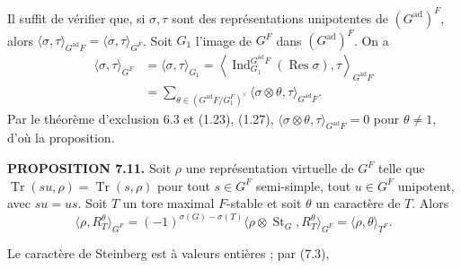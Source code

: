 \documentclass[9pt,twoside]{extarticle}
\begin{document}
{Il suffit de vérifier que, si \(\sigma,\tau\) sont des représentations unipotentes de \((G^{\mathrm{ad}})^F\), alors \(\langle\sigma,\tau\rangle_{G^{\mathrm{ad}}F}=\langle\sigma,\tau\rangle_{G^F}\). Soit \(G_1\) l'image de \(G^F\) dans \((G^{\mathrm{ad}})^F\). On a \[
\begin{aligned}
\langle\sigma,\tau\rangle_{G^F}
&=\langle\sigma,\tau\rangle_{G_1}
=\left\langle\operatorname{Ind}_{G_1}^{G^{\mathrm{ad}}F}(\operatorname{Res}\sigma),\tau\right\rangle_{G^{\mathrm{ad}}F}\\
&=\sum_{\theta\in(G^{\mathrm{ad}}F/G_1^F)^\vee}
\langle\sigma\otimes\theta,\tau\rangle_{G^{\mathrm{ad}}F}.
\end{aligned}
\] Par le théorème d'exclusion 6.3 et (1.23), (1.27), \(\langle\sigma\otimes\theta,\tau\rangle_{G^{\mathrm{ad}}F}=0\) pour \(\theta\ne1\), d'où la proposition.\par

\noindent\textbf{PROPOSITION 7.11.} Soit \(\rho\) une représentation virtuelle de \(G^F\) telle que \(\operatorname{Tr}(su,\rho)=\operatorname{Tr}(s,\rho)\) pour tout \(s\in G^F\) semi-simple, tout \(u\in G^F\) unipotent, avec \(su=us\). Soit \(T\) un tore maximal \(F\)-stable et soit \(\theta\) un caractère de \(T\). Alors \[
\langle\rho,R_T^\theta\rangle_{G^F}
=(-1)^{\sigma(G)-\sigma(T)}\langle\rho\otimes\operatorname{St}_G,R_T^\theta\rangle_{G^F}
=\langle\rho,\theta\rangle_{T^F}.
\]\par

Le caractère de Steinberg est à valeurs entières ; par (7.3),\par
}
\end{document}
